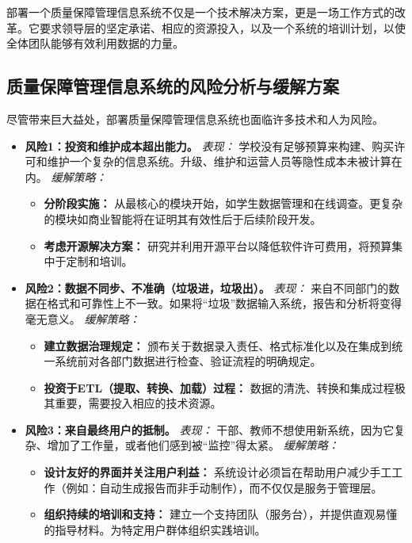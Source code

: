 部署一个质量保障管理信息系统不仅是一个技术解决方案，更是一场工作方式的改革。它要求领导层的坚定承诺、相应的资源投入，以及一个系统的培训计划，以使全体团队能够有效利用数据的力量。

\subsection{质量保障管理信息系统的风险分析与缓解方案}
\label{subsec:risk_qamis}
尽管带来巨大益处，部署质量保障管理信息系统也面临许多技术和人为风险。

\begin{itemize}
    \item \textbf{风险1：投资和维护成本超出能力。}
    \textit{表现：} 学校没有足够预算来构建、购买许可和维护一个复杂的信息系统。升级、维护和运营人员等隐性成本未被计算在内。
    \textit{缓解策略：}
    \begin{itemize}
        \item \textbf{分阶段实施：} 从最核心的模块开始，如学生数据管理和在线调查。更复杂的模块如商业智能将在证明其有效性后于后续阶段开发。
        \item \textbf{考虑开源解决方案：} 研究并利用开源平台以降低软件许可费用，将预算集中于定制和培训。
    \end{itemize}

    \item \textbf{风险2：数据不同步、不准确（垃圾进，垃圾出）。}
    \textit{表现：} 来自不同部门的数据在格式和可靠性上不一致。如果将“垃圾”数据输入系统，报告和分析将变得毫无意义。
    \textit{缓解策略：}
    \begin{itemize}
        \item \textbf{建立数据治理规定：} 颁布关于数据录入责任、格式标准化以及在集成到统一系统前对各部门数据进行检查、验证流程的明确规定。
        \item \textbf{投资于ETL（提取、转换、加载）过程：} 数据的清洗、转换和集成过程极其重要，需要投入相应的技术资源。
    \end{itemize}
    
    \item \textbf{风险3：来自最终用户的抵制。}
    \textit{表现：} 干部、教师不想使用新系统，因为它复杂、增加了工作量，或者他们感到被“监控”得太紧。
    \textit{缓解策略：}
    \begin{itemize}
        \item \textbf{设计友好的界面并关注用户利益：} 系统设计必须旨在帮助用户减少手工工作（例如：自动生成报告而非手动制作），而不仅仅是服务于管理层。
        \item \textbf{组织持续的培训和支持：} 建立一个支持团队（服务台），并提供直观易懂的指导材料。为特定用户群体组织实践培训。
    \end{itemize}
\end{itemize}

